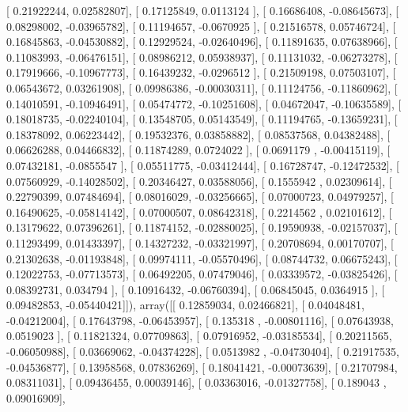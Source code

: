 \documentclass{article}
\begin{document}
       [ 0.21922244,  0.02582807],
       [ 0.17125849,  0.0113124 ],
       [ 0.16686408, -0.08645673],
       [ 0.08298002, -0.03965782],
       [ 0.11194657, -0.0670925 ],
       [ 0.21516578,  0.05746724],
       [ 0.16845863, -0.04530882],
       [ 0.12929524, -0.02640496],
       [ 0.11891635,  0.07638966],
       [ 0.11083993, -0.06476151],
       [ 0.08986212,  0.05938937],
       [ 0.11131032, -0.06273278],
       [ 0.17919666, -0.10967773],
       [ 0.16439232, -0.0296512 ],
       [ 0.21509198,  0.07503107],
       [ 0.06543672,  0.03261908],
       [ 0.09986386, -0.00030311],
       [ 0.11124756, -0.11860962],
       [ 0.14010591, -0.10946491],
       [ 0.05474772, -0.10251608],
       [ 0.04672047, -0.10635589],
       [ 0.18018735, -0.02240104],
       [ 0.13548705,  0.05143549],
       [ 0.11194765, -0.13659231],
       [ 0.18378092,  0.06223442],
       [ 0.19532376,  0.03858882],
       [ 0.08537568,  0.04382488],
       [ 0.06626288,  0.04466832],
       [ 0.11874289,  0.0724022 ],
       [ 0.0691179 , -0.00415119],
       [ 0.07432181, -0.0855547 ],
       [ 0.05511775, -0.03412444],
       [ 0.16728747, -0.12472532],
       [ 0.07560929, -0.14028502],
       [ 0.20346427,  0.03588056],
       [ 0.1555942 ,  0.02309614],
       [ 0.22790399,  0.07484694],
       [ 0.08016029, -0.03256665],
       [ 0.07000723,  0.04979257],
       [ 0.16490625, -0.05814142],
       [ 0.07000507,  0.08642318],
       [ 0.2214562 ,  0.02101612],
       [ 0.13179622,  0.07396261],
       [ 0.11874152, -0.02880025],
       [ 0.19590938, -0.02157037],
       [ 0.11293499,  0.01433397],
       [ 0.14327232, -0.03321997],
       [ 0.20708694,  0.00170707],
       [ 0.21302638, -0.01193848],
       [ 0.09974111, -0.05570496],
       [ 0.08744732,  0.06675243],
       [ 0.12022753, -0.07713573],
       [ 0.06492205,  0.07479046],
       [ 0.03339572, -0.03825426],
       [ 0.08392731,  0.034794  ],
       [ 0.10916432, -0.06760394],
       [ 0.06845045,  0.0364915 ],
       [ 0.09482853, -0.05440421]]), array([[ 0.12859034,  0.02466821],
       [ 0.04048481, -0.04212004],
       [ 0.17643798, -0.06453957],
       [ 0.135318  , -0.00801116],
       [ 0.07643938,  0.0519023 ],
       [ 0.11821324,  0.07709863],
       [ 0.07916952, -0.03185534],
       [ 0.20211565, -0.06050988],
       [ 0.03669062, -0.04374228],
       [ 0.0513982 , -0.04730404],
       [ 0.21917535, -0.04536877],
       [ 0.13958568,  0.07836269],
       [ 0.18041421, -0.00073639],
       [ 0.21707984,  0.08311031],
       [ 0.09436455,  0.00039146],
       [ 0.03363016, -0.01327758],
       [ 0.189043  ,  0.09016909],
\end{document}
